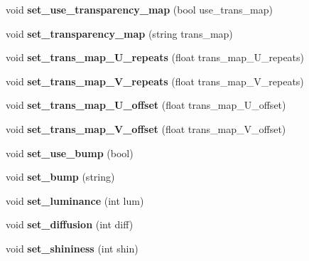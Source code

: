 \begin{DoxyCompactItemize}
void {\bfseries set\+\_\+use\+\_\+transparency\+\_\+map} (bool use\+\_\+trans\+\_\+map)
\item 
\mbox{\label{classmaterial_a5070c6cd92644fd8787b623bf9b44684}} 
void {\bfseries set\+\_\+transparency\+\_\+map} (string trans\+\_\+map)
\item 
\mbox{\label{classmaterial_a044c25a67ce59ed29a24f9528c001bd8}} 
void {\bfseries set\+\_\+trans\+\_\+map\+\_\+\+U\+\_\+repeats} (float trans\+\_\+map\+\_\+\+U\+\_\+repeats)
\item 
\mbox{\label{classmaterial_a2f2338b6253d29ec85b383502b3f2459}} 
void {\bfseries set\+\_\+trans\+\_\+map\+\_\+\+V\+\_\+repeats} (float trans\+\_\+map\+\_\+\+V\+\_\+repeats)
\item 
\mbox{\label{classmaterial_a6c6d3125fca60347fcda6e743d2302ac}} 
void {\bfseries set\+\_\+trans\+\_\+map\+\_\+\+U\+\_\+offset} (float trans\+\_\+map\+\_\+\+U\+\_\+offset)
\item 
\mbox{\label{classmaterial_a1ca6ee1f3dfb734f87fc535b1af8a710}} 
void {\bfseries set\+\_\+trans\+\_\+map\+\_\+\+V\+\_\+offset} (float trans\+\_\+map\+\_\+\+V\+\_\+offset)
\item 
\mbox{\label{classmaterial_a5ad7f22b608d724c7a69f735737831d8}} 
void {\bfseries set\+\_\+use\+\_\+bump} (bool)
\item 
\mbox{\label{classmaterial_a090fec60f7f42081f671addb8ab1b8b9}} 
void {\bfseries set\+\_\+bump} (string)
\item 
\mbox{\label{classmaterial_a99d19756c96e2e4f9602a5dea9fa7ede}} 
void {\bfseries set\+\_\+luminance} (int lum)
\item 
\mbox{\label{classmaterial_a074beebc9fc4ebe20574215398086ee9}} 
void {\bfseries set\+\_\+diffusion} (int diff)
\item 
\mbox{\label{classmaterial_ae39ead64325f5877bb5b71c60d0110ea}} 
void {\bfseries set\+\_\+shininess} (int shin)
\item 
\mbox{\label{classmaterial_ad963c73d469c2811a56e5cf99e04b71e}} 

\end{DoxyCompactItemize}
